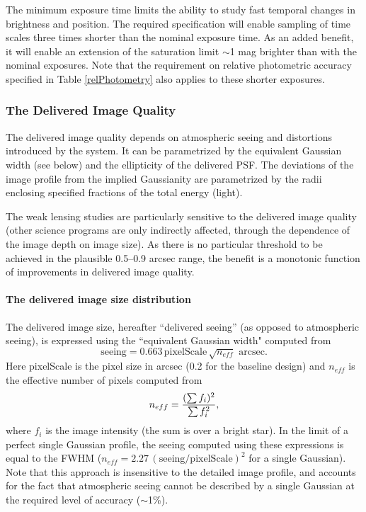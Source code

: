 The minimum exposure time limits the ability to study fast temporal
changes in brightness and position. The required specification will
enable sampling of time scales three times shorter than the nominal
exposure time. As an added benefit, it will enable an extension of the
saturation limit $\sim$1 mag brighter than with the nominal exposures.
Note that the requirement on relative photometric accuracy specified in
Table \ref{relPhotometry} also applies to these shorter exposures.

\subsubsection{        The Delivered Image Quality       }

The delivered image quality depends on atmospheric seeing and distortions
introduced by the system. It can be parametrized by the equivalent Gaussian
width (see below) and the ellipticity of the delivered PSF.  The deviations
of the image profile from the implied Gaussianity are parametrized by the
radii enclosing specified fractions of the total energy (light).

The weak lensing studies are particularly sensitive to the delivered image
quality (other science programs are only indirectly affected, \eg
through the dependence of the image depth on image size). As there is no
particular threshold to be achieved in the plausible 0.5--0.9 arcsec range,
the benefit is a monotonic function of improvements in delivered image
quality.


\paragraph{The delivered image size distribution\\}


The delivered image size, hereafter ``delivered seeing'' (as opposed to
atmospheric seeing), is expressed using the ``equivalent Gaussian width"
computed from
\begin{equation}
      \mathrm{seeing} = 0.663 \, \mathrm{pixelScale} \, \sqrt{n_{eff}} \,\,\mathrm{arcsec}.
\end{equation}
Here pixelScale is the pixel size in arcsec (0.2 for the baseline
design) and $n_{eff}$ is the effective number of pixels computed from
\begin{equation}
        n_{eff}  = {(\sum f_i)^2 \over \sum f_i^2},
\end{equation}
where $f_i$ is the image intensity (\ie the sum is over a bright
star).  In the limit of a perfect single Gaussian profile, the seeing computed
using these expressions is equal to the FWHM
($n_{eff}=2.27\,(\mathrm{seeing/pixelScale})^2$ for a single Gaussian). Note that
this approach is insensitive to the detailed image profile, and accounts
for the fact that atmospheric seeing cannot be described by a single
Gaussian at the required level of accuracy ($\sim$1\%).

